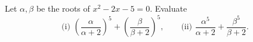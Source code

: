 Let $\alpha,\beta$ be the roots of $x^2-2x-5=0$. Evaluate
\[
\text{(i) }\left(\dfrac{\alpha}{\alpha+2}\right)^5+
\left(\dfrac{\beta}{\beta+2}\right)^5,\qquad
\text{(ii) }\dfrac{\alpha^5}{\alpha+2}+\dfrac{\beta^5}{\beta+2}.
\]
